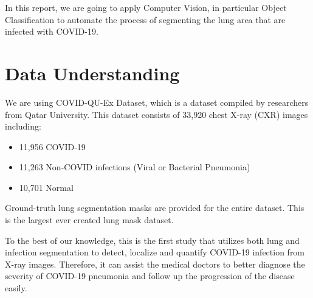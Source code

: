 \documentclass{article}
\begin{document}
\begin{multicols}{2}
In this report, we are going to apply Computer Vision, in particular Object Classification to automate the process of segmenting the lung area that are infected with COVID-19.
\section{Data Understanding}
We are using COVID-QU-Ex Dataset, which is a dataset compiled by researchers from Qatar University. This dataset consists of 33,920 chest X-ray (CXR) images including:
\begin{itemize}
    \item 11,956 COVID-19
    \item 11,263 Non-COVID infections (Viral or Bacterial Pneumonia)
    \item 10,701 Normal
\end{itemize}
Ground-truth lung segmentation masks are provided for the entire dataset. This is the largest ever created lung mask dataset.

To the best of our knowledge, this is the first study that utilizes both lung and infection segmentation to detect, localize and quantify COVID-19 infection from X-ray images. Therefore, it can assist the medical doctors to better diagnose the severity of COVID-19 pneumonia and follow up the progression of the disease easily.


\end{multicols}
\end{document}
